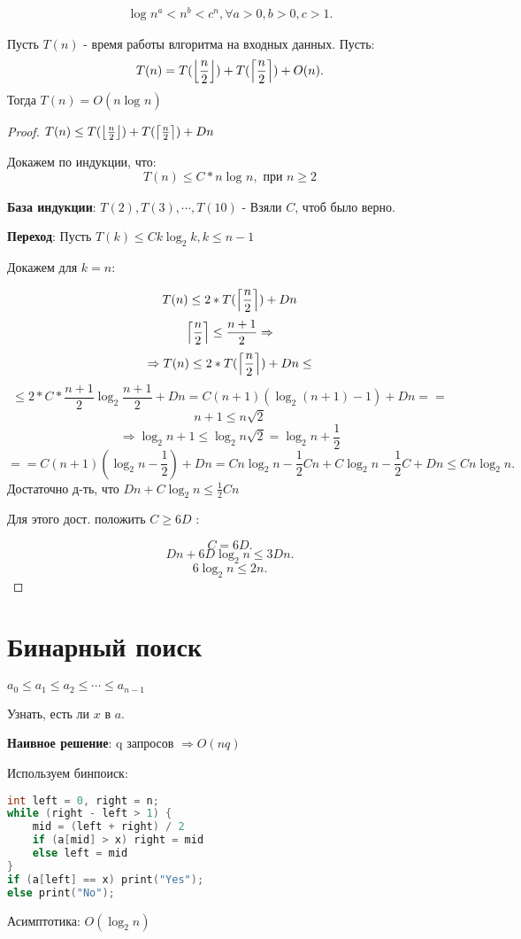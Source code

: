 \begin{statement}
\[
\log_{}{n}^{a} < n^{b} < c^{n}, \forall a > 0, b > 0, c > 1
.\] 
\end{statement}
\begin{statement}
Пусть $T(n)$ - время работы влгоритма на входных данных. Пусть:
\[
T(n) = T(\left\lfloor \frac{n}{2} \right\rfloor) + T(\left\lceil \frac{n}{2} \right\rceil) + O(n)
.\] 
Тогда $T(n) = O(n\log_{}{n})$
\end{statement}
\begin{proof}
$T(n) \leq T(\left\lfloor \frac{n}{2} \right\rfloor) + T(\left\lceil \frac{n}{2} \right\rceil) + Dn$ 

Докажем по индукции, что:
\[
    T(n) \leq C * n\log_{}{n}, \text{ при } n \geq 2
\]

\textbf{База индукции}: $T(2), T(3), \cdots, T(10)$ - Взяли $C$, чтоб было верно.

\textbf{Переход}: Пусть $T(k) \leq Ck\log_{2}{k}, k \leq n - 1$ 

Докажем для $k = n$:

\[
T(n) \leq 2 * T(\left\lceil \frac{n}{2} \right\rceil) + Dn
\] 
\[
\left\lceil \frac{n}{2} \right\rceil \leq \frac{n + 1}{2} \Rightarrow
\] 
\[
\Rightarrow T(n) \leq 2 * T(\left\lceil \frac{n}{2} \right\rceil) + Dn \leq
\] 
\[
\leq 2 * C * \frac{n + 1}{2} \log_{2}{\frac{n + 1}{2}} + Dn = C(n + 1)(\log_{2}{(n + 1)} - 1) + Dn ==
\] 
\[
n + 1 \leq n\sqrt{2}
\] 
\[
\Rightarrow \log_{2}{n + 1} \leq \log_{2}{n\sqrt{2}} = \log_{2}{n} + \frac{1}{2}
\] 
\[
== C(n + 1)(\log_{2}{n} - \frac{1}{2}) + Dn = Cn\log_{2}{n} - \frac{1}{2}Cn + C\log_{2}{n} - \frac{1}{2}C + Dn \leq Cn\log_{2}{n}
.\] 
Достаточно д-ть, что $Dn + C\log_{2}{n} \leq \frac{1}{2}Cn$

Для этого дост. положить $C \geq 6D$ :

 \[
 C = 6D
 .\] 
 \[
 Dn + 6D\log_{2}{n} \leq 3Dn
 .\] 
 \[
 6\log_{2}{n} \leq 2n
 .\] 
\end{proof}

\section{Бинарный поиск}
\begin{task}
$a_0 \leq a_1 \leq a_2 \leq \cdots \leq a_{n - 1}$
 
Узнать, есть ли $x$ в $a$.

\textbf{Наивное решение}: q запросов $\Rightarrow O(nq)$
\end{task}

\begin{solution}
Используем бинпоиск:
\lstset{style=mystyle}
\begin{lstlisting}[language=C++, caption=Binary Search]
int left = 0, right = n;
while (right - left > 1) {
    mid = (left + right) / 2 
    if (a[mid] > x) right = mid
    else left = mid
}
if (a[left] == x) print("Yes");
else print("No");
\end{lstlisting}
Асимптотика: $O(\log_{2}{n})$
\end{solution}

